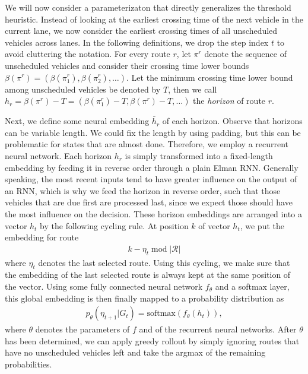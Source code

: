 \documentclass[a4paper]{report}
\theoremstyle{definition}
\theoremstyle{plain}
\begin{document}
We will now consider a parameterizaton that directly generalizes the
threshold heuristic. Instead of looking at the earliest crossing time of the
next vehicle in the current lane, we now consider the earliest crossing
times of all unscheduled vehicles across lanes.
%
In the following definitions, we drop the step index $t$ to avoid
cluttering the notation.
%
For every route $r$, let $\pi^{r}$ denote the sequence of unscheduled vehicles
and consider their crossing time lower bounds
$\beta(\pi^{r}) = (\beta(\pi^{r}_{1}), \beta(\pi^{r}_{2}), \dots)$. Let the
minimum crossing time lower bound among unscheduled vehicles be denoted by $T$,
then we call
$h_{r} = \beta(\pi^{r}) - T = (\beta(\pi^{r}_{1}) - T, \beta(\pi^{r}) - T, \dots)$
the \textit{horizon} of route $r$.

Next, we define some neural embedding $\bar{h}_{r}$ of each horizon. Observe
that horizons can be variable length. We could fix the length by using padding,
but this can be problematic for states that are almost done. Therefore, we
employ a recurrent neural network. Each horizon $h_r$ is simply transformed into
a fixed-length embedding by feeding it in reverse order through a plain Elman
RNN. Generally speaking, the most recent inputs tend to have greater influence
on the output of an RNN, which is why we feed the horizon in reverse order, such
that those vehicles that are due first are processed last, since we expect those
should have the most influence on the decision. These horizon embeddings are
arranged into a vector $h_{t}$ by the following cycling rule. At position $k$ of
vector $h_{t}$, we put the embedding for route
\begin{align*}
  k - \eta_{t} \; \mathrm{mod} \; |\mathcal{R}|
\end{align*}
where $\eta_{t}$ denotes the last selected route. Using this cycling, we make sure
that the embedding of the last selected route is always kept at the same
position of the vector.
%
Using some fully connected neural network $f_{\theta}$ and a softmax layer, this
global embedding is then finally mapped to a probability distribution as
\begin{align*}
  p_{\theta}(\eta_{t+1} | G_{t}) = \text{softmax} ( f_{\theta}(h_{t})) ,
\end{align*}
where $\theta$ denotes the parameters of $f$ and of the recurrent neural
networks.
After $\theta$ has been determined, we can apply greedy rollout by simply
ignoring routes that have no unscheduled vehicles left and take the argmax of
the remaining probabilities.
\end{document}
